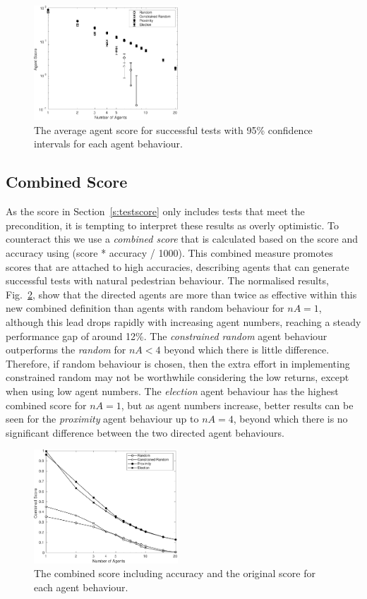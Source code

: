 \documentclass[letterpaper, 10 pt, journal, twoside]{IEEEtran}
\begin{document}
\begin{figure}[!t]
	\centering
\includegraphics[width=0.48\textwidth]{AgentScore.pdf}
	\caption{The average agent score for successful tests with 95\% confidence intervals for each agent behaviour.}
	\label{f:agentscore}
\end{figure}

\subsection{Combined Score}
As the score in Section~\ref{s:testscore} only includes tests that meet the precondition, it is tempting to interpret these results as overly optimistic. To counteract this we use a \textit{combined score} that is calculated based on the score and accuracy using (score * accuracy / 1000). This combined measure promotes scores that are attached to high accuracies, describing agents that can generate successful tests with natural pedestrian behaviour. The normalised results, Fig.~\ref{f:combined}, show that the directed agents are more than twice as effective within this new combined definition than agents with random behaviour for $nA=1$, although this lead drops rapidly with increasing agent numbers, reaching a steady performance gap of around 12\%. The \textit{constrained random} agent behaviour outperforms the \textit{random} for $nA<4$ beyond which there is little difference. Therefore, if random behaviour is chosen, then the extra effort in implementing constrained random may not be worthwhile considering the low returns, except when using low agent numbers. The \textit{election} agent behaviour has the highest combined score for $nA=1$, but as agent numbers increase, better results can be seen for the \textit{proximity} agent behaviour up to $nA=4$, beyond which there is no significant difference between the two directed agent behaviours.

\begin{figure}[!t]
	\centering
\includegraphics[width=0.48\textwidth]{Combined.pdf}
	\caption{The combined score including accuracy and the original score for each agent behaviour.}
	\label{f:combined}
\end{figure}
\end{document}
